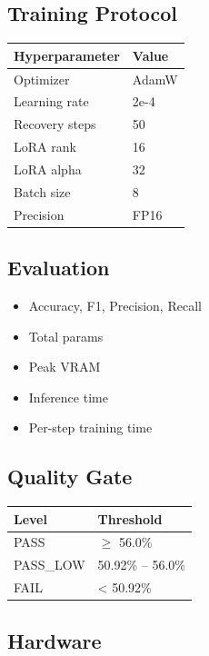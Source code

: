 \subsection{Training Protocol}

\begin{table}[H]
\centering
\small
\begin{tabular}{ll}
\toprule
\textbf{Hyperparameter} & \textbf{Value} \\
\midrule
Optimizer & AdamW \\
Learning rate & 2e-4 \\
Recovery steps & 50 \\
LoRA rank & 16 \\
LoRA alpha & 32 \\
Batch size & 8 \\
Precision & FP16 \\
\bottomrule
\end{tabular}
\end{table}

\subsection{Evaluation}

\begin{itemize}
\item Accuracy, F1, Precision, Recall
\item Total params
\item Peak VRAM
\item Inference time
\item Per-step training time

\end{itemize}
\subsection{Quality Gate}

\begin{table}[H]
\centering
\small
\begin{tabular}{ll}
\toprule
\textbf{Level} & \textbf{Threshold} \\
\midrule
PASS & $\ge$ 56.0\% \\
PASS\_LOW & 50.92\% -- 56.0\% \\
FAIL & \textless{} 50.92\% \\
\bottomrule
\end{tabular}
\end{table}

\subsection{Hardware}

